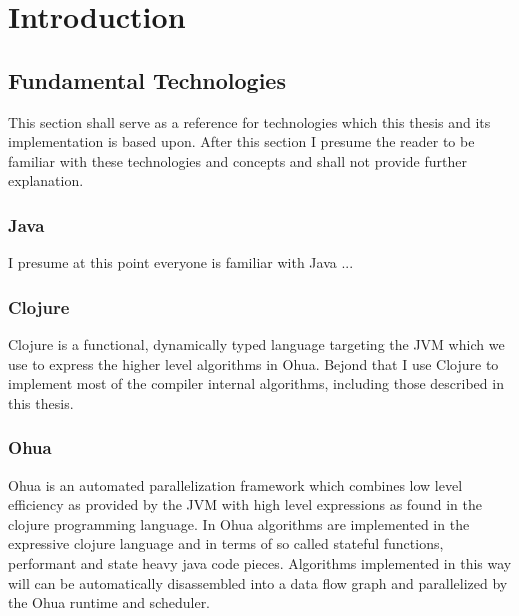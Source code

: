 
\chapter{Introduction} %

\label{ChapterIntro} %


\section{Fundamental Technologies}

This section shall serve as a reference for technologies which this thesis and its implementation is based upon.
After this section I presume the reader to be familiar with these technologies and concepts and shall not provide further explanation.

\subsection{Java}

I presume at this point everyone is familiar with Java ...

\subsection{Clojure}

Clojure is a functional, dynamically typed language targeting the JVM  which we use to express the higher level algorithms in Ohua.
Bejond that I use Clojure to implement most of the compiler internal algorithms, including those described in this thesis.

\subsection{Ohua}

Ohua is an automated parallelization framework which combines low level efficiency as provided by the JVM with high level expressions as found in the clojure programming language.
In Ohua algorithms are implemented in the expressive clojure language and in terms of so called stateful functions, performant and state heavy java code pieces.
Algorithms implemented in this way will can be automatically disassembled into a data flow graph and parallelized by the Ohua runtime and scheduler.
